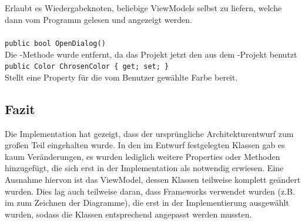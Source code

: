 \paragraph{}~\\
Erlaubt es Wiedergabeknoten, beliebige ViewModels selbst zu liefern, welche dann vom Programm gelesen und angezeigt werden.

\paragraph{}
\begin{itemize}
	\remove \verb!public bool OpenDialog()! \\
	Die -Methode wurde entfernt, da das Projekt jetzt den  aus dem -Projekt benutzt
	\add \verb!public Color ChrosenColor { get; set; }! \\
	Stellt eine Property für die vom Benutzer gewählte Farbe bereit.
\end{itemize}
\newpage

\subsection*{Fazit}

Die Implementation hat gezeigt, dass der ursprüngliche Architekturentwurf zum großen Teil eingehalten wurde. In den im Entwurf festgelegten Klassen gab es kaum Veränderungen, es wurden lediglich weitere Properties oder Methoden hinzugefügt, die sich erst in der Implementation als notwendig erwiesen. Eine Ausnahme hiervon ist das ViewModel, dessen Klassen teilweise 
komplett geändert wurden. Dies lag auch teilweise daran, dass Frameworks verwendet wurden (z.B. im  zum Zeichnen der Diagramme), die erst in der Implementierung ausgewählt wurden, sodass die Klassen entsprechend angepasst werden mussten.
